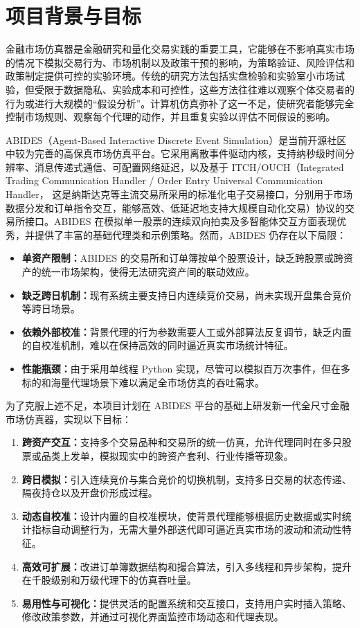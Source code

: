 \section{项目背景与目标}

金融市场仿真器是金融研究和量化交易实践的重要工具，它能够在不影响真实市场的情况下模拟交易行为、市场机制以及政策干预的影响，为策略验证、风险评估和政策制定提供可控的实验环境。传统的研究方法包括实盘检验和实验室小市场试验，但受限于数据隐私、实验成本和可控性，这些方法往往难以观察个体交易者的行为或进行大规模的“假设分析”。计算机仿真弥补了这一不足，使研究者能够完全控制市场规则、观察每个代理的动作，并且重复实验以评估不同假设的影响。

ABIDES（Agent‐Based Interactive Discrete Event Simulation）是当前开源社区中较为完善的高保真市场仿真平台。它采用离散事件驱动内核，支持纳秒级时间分辨率、消息传递式通信、可配置网络延迟，以及基于 ITCH/OUCH（Integrated Trading Communication Handler / Order Entry Universal Communication Handler， 这是纳斯达克等主流交易所采用的标准化电子交易接口，分别用于市场数据分发和订单指令交互，能够高效、低延迟地支持大规模自动化交易）协议的交易所接口。ABIDES 在模拟单一股票的连续双向拍卖及多智能体交互方面表现优秀，并提供了丰富的基础代理类和示例策略。然而，ABIDES 仍存在以下局限：
\begin{itemize}
  \item \textbf{单资产限制：}ABIDES 的交易所和订单簿按单个股票设计，缺乏跨股票或跨资产的统一市场架构，使得无法研究资产间的联动效应。
  \item \textbf{缺乏跨日机制：}现有系统主要支持日内连续竞价交易，尚未实现开盘集合竞价等跨日场景。
  \item \textbf{依赖外部校准：}背景代理的行为参数需要人工或外部算法反复调节，缺乏内置的自校准机制，难以在保持高效的同时逼近真实市场统计特征。
  \item \textbf{性能瓶颈：}由于采用单线程 Python 实现，尽管可以模拟百万次事件，但在多标的和海量代理场景下难以满足全市场仿真的吞吐需求。
\end{itemize}

为了克服上述不足，本项目计划在 ABIDES 平台的基础上研发新一代全尺寸金融市场仿真器，实现以下目标：
\begin{enumerate}
  \item \textbf{跨资产交互：}支持多个交易品种和交易所的统一仿真，允许代理同时在多只股票或品类上发单，模拟现实中的跨资产套利、行业传播等现象。
  \item \textbf{跨日模拟：}引入连续竞价与集合竞价的切换机制，支持多日交易的状态传递、隔夜持仓以及开盘价形成过程。
  \item \textbf{动态自校准：}设计内置的自校准模块，使背景代理能够根据历史数据或实时统计指标自动调整行为，无需大量外部迭代即可逼近真实市场的波动和流动性特征。
  \item \textbf{高效可扩展：}改进订单簿数据结构和撮合算法，引入多线程和异步架构，提升在千股级别和万级代理下的仿真吞吐量。
  \item \textbf{易用性与可视化：}提供灵活的配置系统和交互接口，支持用户实时插入策略、修改政策参数，并通过可视化界面监控市场动态和代理表现。
\end{enumerate}

